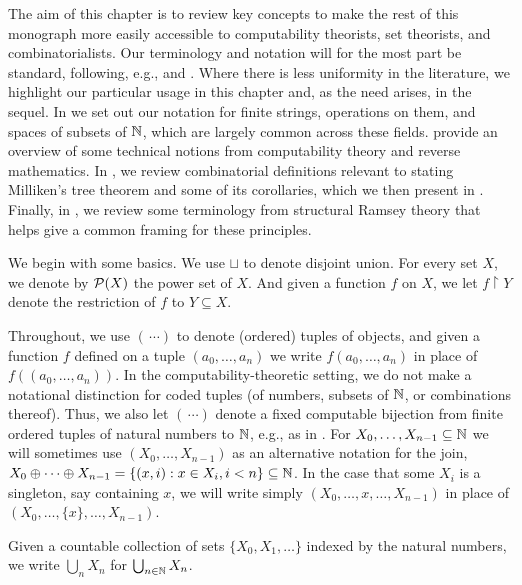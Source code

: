 The aim of this chapter is to review key concepts to make the rest of this monograph more easily accessible to computability theorists, set theorists, and combinatorialists. Our terminology and notation will for the most part be standard, following, e.g., \cite{Downey2010Algorithmic} and \cite{Todorcevic2010Ramsey}. Where there is less uniformity in the literature, we highlight our particular usage in this chapter and, as the need arises, in the sequel. In  we set out our notation for finite strings, operations on them, and spaces of subsets of $\mathbb{N}$, which are largely common across these fields.  provide an overview of some technical notions from computability theory and reverse mathematics. In , we review combinatorial definitions relevant to stating Milliken's tree theorem and some of its corollaries, which we then present in . Finally, in , we review some terminology from structural Ramsey theory that helps give a common framing for these principles.


We begin with some basics. We use $\sqcup$\index{$\sqcup$} to denote disjoint union. For every set $X$, we denote by $\mathcal{P}(X)$ the power set of $X$. And given a function $f$ on $X$, we let $f \upharpoonright Y$\index{$\upharpoonright$} denote the restriction of $f$ to $Y \subseteq X$.

Throughout, we use $(\, \cdots )$ to denote (ordered) tuples of objects, and given a function $f$ defined on a tuple $(a_0,\ldots,a_n)$ we write $f(a_0,\ldots,a_n)$ in place of $f((a_0,\ldots,a_n))$. In the computability-theoretic setting, we do not make a notational distinction for coded tuples (of numbers, subsets of $\mathbb{N}$, or combinations thereof). Thus, we also let $(\, \cdots )$ denote a fixed computable bijection from finite ordered tuples of natural numbers to $\mathbb{N}$, e.g., as in \cite[p.~xxxii]{Soare2016Turing}. For $X_0,\ldots,X_{n-1} \subseteq \mathbb{N}$ we will sometimes use $(X_0,\ldots,X_{n-1})$ as an alternative notation for the join, $X_0 \oplus \cdots \oplus X_{n-1} = \{(x,i): x \in X_i, i < n\} \subseteq \mathbb{N}$\index{$\oplus$}. In the case that some $X_i$ is a singleton, say containing $x$, we will write simply $(X_0,\ldots,x,\ldots,X_{n-1})$ in place of $(X_0,\ldots,\{x\},\ldots,X_{n-1})$.

Given a countable collection of sets $\{X_0,X_1,\ldots\}$ indexed by the natural numbers, we write $\bigcup_n X_n$ for $\bigcup_{n \in \mathbb{N}} X_n$.

